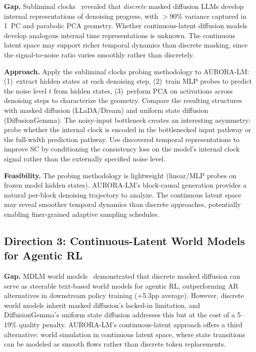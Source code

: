 \documentclass[11pt,a4paper]{article}
\begin{document}
\textbf{Gap.} Subliminal clocks~\cite{subliminalclocks2026} revealed that \emph{discrete} masked diffusion LLMs develop internal representations of denoising progress, with $>$90\% variance captured in 1~PC and parabolic PCA geometry. Whether continuous-latent diffusion models develop analogous internal time representations is unknown. The continuous latent space may support richer temporal dynamics than discrete masking, since the signal-to-noise ratio varies smoothly rather than discretely.

\textbf{Approach.} Apply the subliminal clocks probing methodology to AURORA-LM: (1)~extract hidden states at each denoising step, (2)~train MLP probes to predict the noise level $t$ from hidden states, (3)~perform PCA on activations across denoising steps to characterize the geometry. Compare the resulting structures with masked diffusion (LLaDA/Dream) and uniform state diffusion (DiffusionGemma). The noisy-input bottleneck creates an interesting asymmetry: probe whether the internal clock is encoded in the bottlenecked input pathway or the full-width prediction pathway. Use discovered temporal representations to improve SC by conditioning the consistency loss on the model's internal clock signal rather than the externally specified noise level.

\textbf{Feasibility.} The probing methodology is lightweight (linear/MLP probes on frozen model hidden states). AURORA-LM's block-causal generation provides a natural per-block denoising trajectory to analyze. The continuous latent space may reveal smoother temporal dynamics than discrete approaches, potentially enabling finer-grained adaptive sampling schedules.

\subsection{Direction 3: Continuous-Latent World Models for Agentic RL}

\textbf{Gap.} MDLM world models~\cite{mdlmwm2026} demonstrated that discrete masked diffusion can serve as steerable text-based world models for agentic RL, outperforming AR alternatives in downstream policy training (+5.3pp average). However, discrete world models inherit masked diffusion's locked-in limitation, and DiffusionGemma's uniform state diffusion addresses this but at the cost of a 5--19\% quality penalty. AURORA-LM's continuous-latent approach offers a third alternative: world simulation in continuous latent space, where state transitions can be modeled as smooth flows rather than discrete token replacements.
\end{document}
